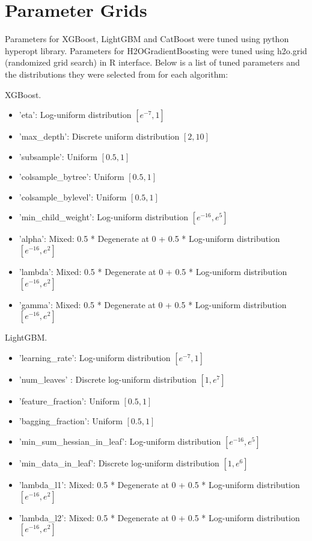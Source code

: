 \documentclass{article}
\begin{document}
\section{Parameter Grids}
Parameters for XGBoost, LightGBM and CatBoost were tuned using python hyperopt library. Parameters for H2OGradientBoosting were tuned using h2o.grid (randomized grid search) in R interface. Below is a list of tuned parameters and the distributions they were selected from for each algorithm:

\medskip
\noindent XGBoost.
\begin{itemize}
  \item 'eta': Log-uniform distribution $[e^{-7}, 1]$
  \item 'max\_depth': Discrete uniform distribution $[2, 10]$
  \item 'subsample': Uniform $[0.5, 1]$
  \item 'colsample\_bytree': Uniform $[0.5, 1]$
  \item 'colsample\_bylevel': Uniform $[0.5, 1]$
  \item 'min\_child\_weight': Log-uniform distribution $[e^{-16}, e^{5}]$
  \item 'alpha': Mixed: 0.5 * Degenerate at 0 + 0.5 * Log-uniform distribution $[e^{-16}, e^{2}]$
  \item 'lambda': Mixed: 0.5 * Degenerate at 0 + 0.5 * Log-uniform distribution $[e^{-16}, e^{2}]$
  \item 'gamma': Mixed: 0.5 * Degenerate at 0 + 0.5 * Log-uniform distribution $[e^{-16}, e^{2}]$
\end{itemize}

\medskip
\noindent LightGBM.
\begin{itemize}
  \item 'learning\_rate': Log-uniform distribution $[e^{-7}, 1]$
  \item 'num\_leaves' : Discrete log-uniform distribution $[1, e^{7}]$
  \item 'feature\_fraction': Uniform $[0.5, 1]$
  \item 'bagging\_fraction': Uniform $[0.5, 1]$
  \item 'min\_sum\_hessian\_in\_leaf': Log-uniform distribution $[e^{-16}, e^{5}]$
  \item 'min\_data\_in\_leaf':  Discrete log-uniform distribution $[1, e^{6}]$
  \item 'lambda\_l1': Mixed: 0.5 * Degenerate at 0 + 0.5 * Log-uniform distribution $[e^{-16}, e^{2}]$
  \item 'lambda\_l2': Mixed: 0.5 * Degenerate at 0 + 0.5 * Log-uniform distribution $[e^{-16}, e^{2}]$
\end{itemize}
\end{document}
